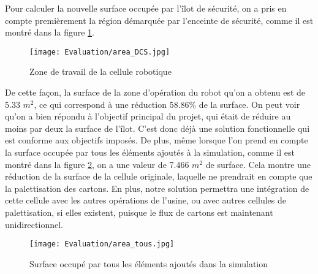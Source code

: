 \newpage {}


Pour calculer la nouvelle surface occupée par l’îlot de sécurité, on a pris en compte premièrement la région démarquée par l’enceinte de sécurité, comme il est montré dans la figure \ref{fig:area_DCS}.

\begin{figure}[H]
	\begin{center}	
		\texttt{[image: Evaluation/area\_DCS.jpg]}
		\caption{ Zone de travail de la cellule robotique}
		\label{fig:area_DCS}
	\end{center}
\end{figure}


De cette façon, la surface de la zone d’opération du robot qu’on a obtenu est de 5.33 $ m^2 $, ce qui correspond à une réduction 58.86\% de la surface. On peut voir qu’on a bien répondu à l’objectif principal du projet, qui était de réduire au moins par deux la surface de l’îlot. C’est donc déjà une solution fonctionnelle qui est conforme aux objectifs imposés.
De plus, même lorsque l’on prend en compte la surface occupée par tous les éléments ajoutés à la simulation, comme il est montré dans la figure \ref{fig:area_tous}, on a une valeur de 7.466 $ m^2 $ de surface. Cela montre une réduction de la surface de la cellule originale, laquelle ne prendrait en compte que la palettisation des cartons. En plus, notre solution permettra une intégration de cette cellule avec les autres opérations de l’usine, ou avec autres cellules de palettisation, si elles existent, puisque le flux de cartons est maintenant unidirectionnel.

\begin{figure}[H]
	\begin{center}	
		\texttt{[image: Evaluation/area\_tous.jpg]}
		\caption{Surface occupé par tous les éléments ajoutés dans la simulation}
		\label{fig:area_tous}
	\end{center}
\end{figure}

\label{cadence}


